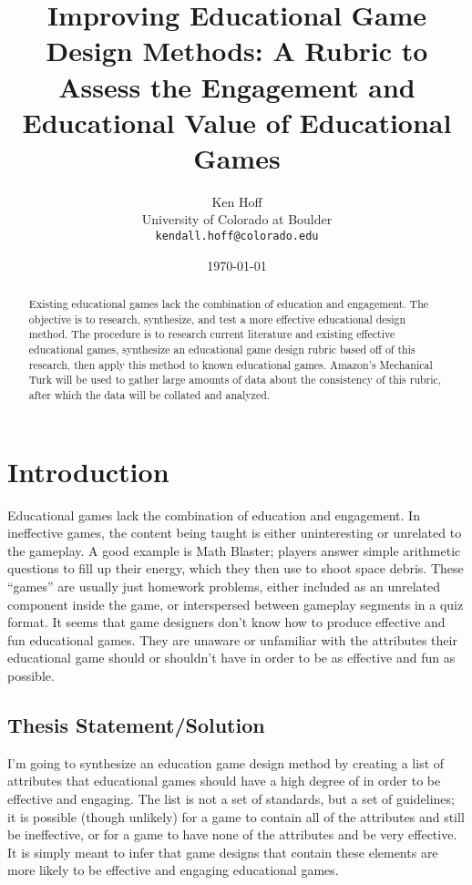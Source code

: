 \documentclass[12pt]{report}
\author{Ken Hoff \\ University of Colorado at Boulder \\ \texttt{kendall.hoff@colorado.edu} 
}
\date{\today}
\title{Improving Educational Game Design Methods: A Rubric to Assess the Engagement and Educational Value of Educational Games
}
\begin{document}
\maketitle

\begin{abstract}

Existing educational games lack the combination of education and engagement. The objective is to research, synthesize, and test a more effective educational design method. The procedure is to research current literature and existing effective educational games, synthesize an educational game design rubric based off of this research, then apply this method to known educational games. Amazon's Mechanical Turk will be used to gather large amounts of data about the consistency of this rubric, after which the data will be collated and analyzed.

\end{abstract}

\tableofcontents
\listoffigures

\chapter{Introduction}
	Educational games lack the combination of education and engagement. In ineffective games, the content being taught is either uninteresting or unrelated to the gameplay. A good example is Math Blaster; players answer simple arithmetic questions to fill up their energy, which they then use to shoot space debris. These “games” are usually just homework problems, either included as an unrelated component inside the game, or interspersed between gameplay segments in a quiz format. It seems that game designers don't know how to produce effective and fun educational games. They are unaware or unfamiliar with the attributes their educational game should or shouldn't have in order to be as effective and fun as possible.

	\section{Thesis Statement/Solution}
		I'm going to synthesize an education game design method by creating a list of attributes that educational games should have a high degree of in order to be effective and engaging. The list is not a set of standards, but a set of guidelines; it is possible (though unlikely) for a game to contain all of the attributes and still be ineffective, or for a game to have none of the attributes and be very effective. It is simply meant to infer that game designs that contain these elements are more likely to be effective and engaging educational games.
\end{document}
